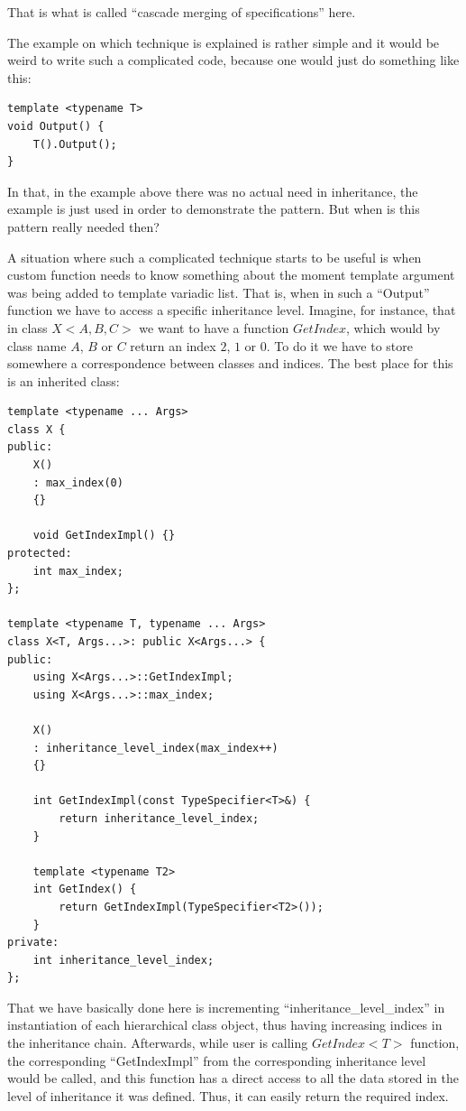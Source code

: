 \documentclass{article}
\begin{document}
That is what is called ``cascade merging of specifications'' here.

The example on which technique is explained is rather simple and it would be weird to write such a complicated code, because one would just do something like this:
\begin{lstlisting}
template <typename T>
void Output() {
	T().Output();
}
\end{lstlisting}
In that, in the example above there was no actual need in inheritance, the example is just used in order to demonstrate the pattern. But when is this pattern really needed then?

A situation where such a complicated technique starts to be useful is when custom function needs to know something about the moment template argument was being added to template variadic list. That is, when in such a ``Output'' function we have to access a specific inheritance level. Imagine, for instance, that in class $X<A,B,C>$ we want to have a function $GetIndex$, which would by class name $A$, $B$ or $C$ return an index $2$, $1$ or $0$. To do it we have to store somewhere a correspondence between classes and indices. The best place for this is an inherited class:

\begin{lstlisting}
template <typename ... Args>
class X {
public:
	X()
	: max_index(0)
	{}

	void GetIndexImpl() {}
protected:
	int max_index;
};

template <typename T, typename ... Args>
class X<T, Args...>: public X<Args...> {
public:
	using X<Args...>::GetIndexImpl;
    using X<Args...>::max_index;

	X()
	: inheritance_level_index(max_index++)
	{}

	int GetIndexImpl(const TypeSpecifier<T>&) {
		return inheritance_level_index;
	}

	template <typename T2>
	int GetIndex() {
		return GetIndexImpl(TypeSpecifier<T2>());
	}
private:
	int inheritance_level_index;
};
\end{lstlisting}
That we have basically done here is incrementing ``inheritance\_level\_index'' in instantiation of each hierarchical class object, thus having increasing indices in the inheritance chain. Afterwards, while user is calling $GetIndex<T>$ function, the corresponding ``GetIndexImpl'' from the corresponding inheritance level would be called, and this function has a direct access to all the data stored in the level of inheritance it was defined. Thus, it can easily return the required index.
\end{document}
